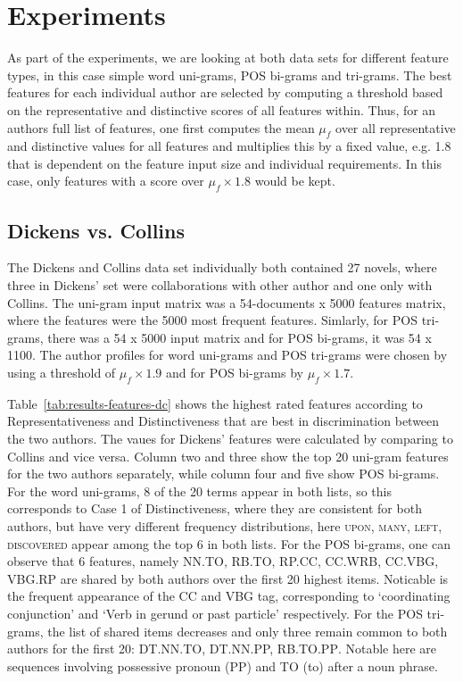 \documentclass[a4paper,10pt,twoside,fleqn]{article}
\begin{document}
\section{Experiments}\label{sec:experiments}
As part of the experiments, we are looking at both data sets
for different feature types, in this case simple word uni-grams,
POS bi-grams and tri-grams. 
The best features for each individual author are selected by 
computing a threshold based on the representative and distinctive
scores of all features within. 
Thus, for an authors full list of features, one first computes 
the mean $\mu_f$ over all representative and distinctive values 
for all features and multiplies this by a fixed value, e.g. 1.8
that is dependent on the feature input size and individual
requirements. In this case, only features with a score over
$\mu_f \times 1.8$ would be kept. 

\subsection{Dickens vs. Collins}
The Dickens and Collins data set individually both contained 27 novels,
where three in Dickens' set were collaborations with other author and 
one only with Collins. The uni-gram input matrix was a 
54-documents x 5000 features matrix, where the features were 
the 5000 most frequent features. 
Simlarly, for POS tri-grams, there was a 54 x 5000 input matrix and
for POS bi-grams, it was 54 x 1100. 
The author profiles for word uni-grams and POS tri-grams were chosen
by using a threshold of $\mu_f \times 1.9$ and for
POS bi-grams by $\mu_f \times 1.7$. 

Table~\ref{tab:results-features-dc} shows the highest rated features 
according to Representativeness and Distinctiveness that are best 
in discrimination between the two authors. The vaues for Dickens' features 
were calculated by comparing to Collins and vice versa. 
Column two and three show the top 20 uni-gram features for the two authors
separately, while column four and five show POS bi-grams. 
For the word uni-grams, 8 of the 20 terms appear in both lists, so this corresponds
to Case 1 of Distinctiveness, where they are consistent for both authors, but
have very different frequency distributions, here \textsc{upon, many, left, discovered}
appear among the top 6 in both lists. 
For the POS bi-grams, one can observe that  6 features, namely
\textsc{NN.TO, RB.TO, RP.CC, CC.WRB, CC.VBG, VBG.RP} 
are shared by both authors over the first 20 highest items. 
Noticable is the frequent appearance of the CC and VBG tag, 
corresponding to `coordinating conjunction' and `Verb in gerund or
past particle' respectively. 
For the POS tri-grams, the list of shared items decreases and only three remain 
common to both authors for the first 20: \textsc{DT.NN.TO,  DT.NN.PP, RB.TO.PP}.
Notable here are sequences involving possessive pronoun (PP) and TO (to) after 
a noun phrase. 
\end{document}
